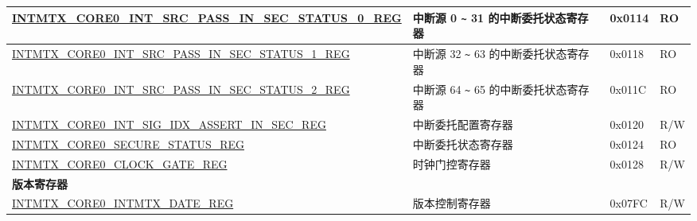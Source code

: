 \begin{longtable}{ | p{10cm} | p{10cm} | p{1.3cm} | p{1cm} | }
\hyperref[regdesc:INTMTXCORE0SRCPASSINSECSTATUS0REG]{INTMTX\_CORE0\_INT\_SRC\_PASS\_IN\_SEC\_STATUS\_0\_REG} & 中断源 0 \verb+~+ 31 的中断委托状态寄存器 & 0x0114 & RO \\ \hline
\hyperref[regdesc:INTMTXCORE0SRCPASSINSECSTATUS1REG]{INTMTX\_CORE0\_INT\_SRC\_PASS\_IN\_SEC\_STATUS\_1\_REG} & 中断源 32 \verb+~+ 63 的中断委托状态寄存器 & 0x0118 & RO \\ \hline
\hyperref[regdesc:INTMTXCORE0SRCPASSINSECSTATUS2REG]{INTMTX\_CORE0\_INT\_SRC\_PASS\_IN\_SEC\_STATUS\_2\_REG} & 中断源 64 \verb+~+ 65 的中断委托状态寄存器 & 0x011C & RO \\ \hline
\hyperref[regdesc:INTMTXCORE0INTSIGIDXASSERTINSECREG]{INTMTX\_CORE0\_INT\_SIG\_IDX\_ASSERT\_IN\_SEC\_REG} & 中断委托配置寄存器 & 0x0120 & R/W \\ \hline
\hyperref[regdesc:INTMTXCORE0SECURESTATUSREG]{INTMTX\_CORE0\_SECURE\_STATUS\_REG} & 中断委托状态寄存器 & 0x0124 & RO \\ \hline
\hyperref[regdesc:INTMTXCORE0CLOCKGATEREG]{INTMTX\_CORE0\_CLOCK\_GATE\_REG} & 时钟门控寄存器 & 0x0128 & R/W \\ \hline
\multicolumn{4}{|l|}{\textbf{版本寄存器}} \\ \hline
\hyperref[regdesc:INTMTXCORE0INTMTXDATEREG]{INTMTX\_CORE0\_INTMTX\_DATE\_REG} & 版本控制寄存器 & 0x07FC & R/W \\ \hline
\end{longtable}
